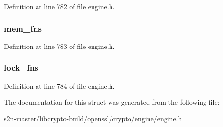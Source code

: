 Definition at line 782 of file engine.\+h.

\subsubsection[{\texorpdfstring{mem\+\_\+fns}{mem_fns}}]{ mem\+\_\+fns}\hypertarget{structst__dynamic__fns_a229ed80675b275e74c412fd89b7363f9}{}\label{structst__dynamic__fns_a229ed80675b275e74c412fd89b7363f9}


Definition at line 783 of file engine.\+h.

\subsubsection[{\texorpdfstring{lock\+\_\+fns}{lock_fns}}]{ lock\+\_\+fns}\hypertarget{structst__dynamic__fns_a53d0c584ab35cfcfa4e86440d2b529ed}{}\label{structst__dynamic__fns_a53d0c584ab35cfcfa4e86440d2b529ed}


Definition at line 784 of file engine.\+h.



The documentation for this struct was generated from the following file\+:\begin{DoxyCompactItemize}
\item 
s2n-\/master/libcrypto-\/build/openssl/crypto/engine/\hyperlink{crypto_2engine_2engine_8h}{engine.\+h}\end{DoxyCompactItemize}
